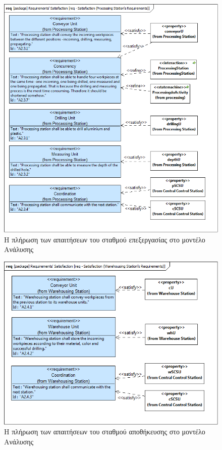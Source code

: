 \documentclass[a4paper,12pt,twoside]{report}
\begin{document}
{\begin{appendices}
			\begin{figure}[hp]
					\centering
					\includegraphics[scale=0.30]{AnalysisModel_req-Satisfaction(ProcessingStationsRequirements).png}
					\caption{Η πλήρωση των απαιτήσεων του σταθμού επεξεργασίας στο μοντέλο Ανάλυσης}
					\label{φωτ:Η πλήρωση των απαιτήσεων του σταθμού επεξεργασίας στο μοντέλο Ανάλυσης}
			\end{figure}
			
			\begin{figure}[hp]
					\centering
					\includegraphics[scale=0.30]{AnalysisModel_req-Satisfaction(WarehousingStationsRequirements).png}
					\caption{Η πλήρωση των απαιτήσεων του σταθμού αποθήκευσης στο μοντέλο Ανάλυσης}
					\label{φωτ:Η πλήρωση των απαιτήσεων του σταθμού αποθήκευσης στο μοντέλο Ανάλυσης}
			\end{figure}
			

\end{appendices}}
\end{document}
